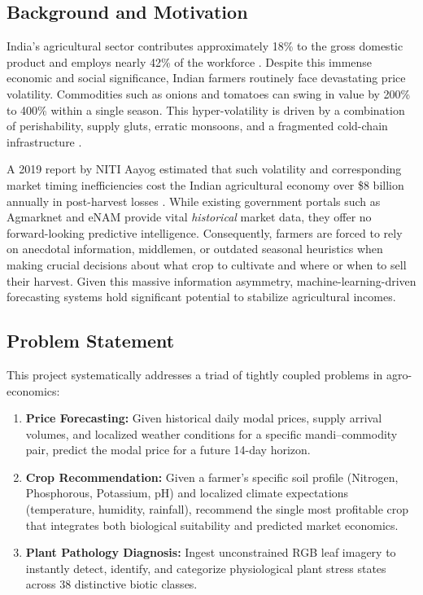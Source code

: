 \documentclass[conference]{IEEEtran}
\begin{document}
\subsection{Background and Motivation}
India's agricultural sector contributes approximately 18\% to the gross domestic product and employs nearly 42\% of the workforce \cite{fao2023}. Despite this immense economic and social significance, Indian farmers routinely face devastating price volatility. Commodities such as onions and tomatoes can swing in value by 200\% to 400\% within a single season. This hyper-volatility is driven by a combination of perishability, supply gluts, erratic monsoons, and a fragmented cold-chain infrastructure \cite{chand2012}. 

A 2019 report by NITI Aayog estimated that such volatility and corresponding market timing inefficiencies cost the Indian agricultural economy over \$8 billion annually in post-harvest losses \cite{nitiaayog2019}. While existing government portals such as Agmarknet and eNAM provide vital \emph{historical} market data, they offer no forward-looking predictive intelligence. Consequently, farmers are forced to rely on anecdotal information, middlemen, or outdated seasonal heuristics when making crucial decisions about what crop to cultivate and where or when to sell their harvest. Given this massive information asymmetry, machine-learning-driven forecasting systems hold significant potential to stabilize agricultural incomes.

\subsection{Problem Statement}
This project systematically addresses a triad of tightly coupled problems in agro-economics:
\begin{enumerate}
    \item \textbf{Price Forecasting:} Given historical daily modal prices, supply arrival volumes, and localized weather conditions for a specific mandi--commodity pair, predict the modal price for a future 14-day horizon.
    \item \textbf{Crop Recommendation:} Given a farmer's specific soil profile (Nitrogen, Phosphorous, Potassium, pH) and localized climate expectations (temperature, humidity, rainfall), recommend the single most profitable crop that integrates both biological suitability and predicted market economics.
    \item \textbf{Plant Pathology Diagnosis:} Ingest unconstrained RGB leaf imagery to instantly detect, identify, and categorize physiological plant stress states across 38 distinctive biotic classes.
\end{enumerate}
\end{document}

